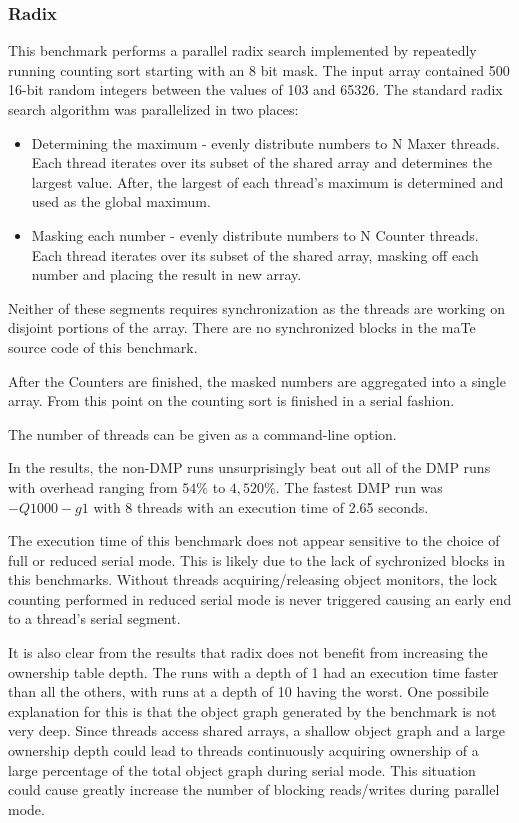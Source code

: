 \subsubsection{Radix}

This benchmark performs a parallel radix search implemented by
repeatedly running counting sort starting with an 8 bit mask.  The
input array contained 500 16-bit random integers between the values of
103 and 65326.  The standard radix search algorithm was parallelized
in two places:

\begin{itemize}
\item Determining the maximum - evenly distribute numbers to N Maxer
  threads.  Each thread iterates over its subset of the shared array
  and determines the largest value.  After, the largest of each
  thread's maximum is determined and used as the global maximum.

\item Masking each number - evenly distribute numbers to N Counter
  threads.  Each thread iterates over its subset of the shared array,
  masking off each number and placing the result in new array.
\end{itemize}

Neither of these segments requires synchronization as the threads are
working on disjoint portions of the array.  There are no synchronized
blocks in the maTe source code of this benchmark.

After the Counters are finished, the masked numbers are aggregated
into a single array.  From this point on the counting sort is finished
in a serial fashion.

The number of threads can be given as a command-line option.

In the results, the non-DMP runs unsurprisingly beat out all of the
DMP runs with overhead ranging from $54\%$ to $4,520\%$.  The fastest
DMP run was $-Q1000 -g1$ with 8 threads with an execution time of 2.65
seconds.

The execution time of this benchmark does not appear sensitive to the
choice of full or reduced serial mode.  This is likely due to the lack
of sychronized blocks in this benchmarks.  Without threads
acquiring/releasing object monitors, the lock counting performed in
reduced serial mode is never triggered causing an early end to a
thread's serial segment.

It is also clear from the results that radix does not benefit from
increasing the ownership table depth.  The runs with a depth of 1 had
an execution time faster than all the others, with runs at a depth of
10 having the worst.  One possibile explanation for this is that the
object graph generated by the benchmark is not very deep.  Since
threads access shared arrays, a shallow object graph and a large
ownership depth could lead to threads continuously acquiring ownership
of a large percentage of the total object graph during serial mode.
This situation could cause greatly increase the number of blocking
reads/writes during parallel mode.

